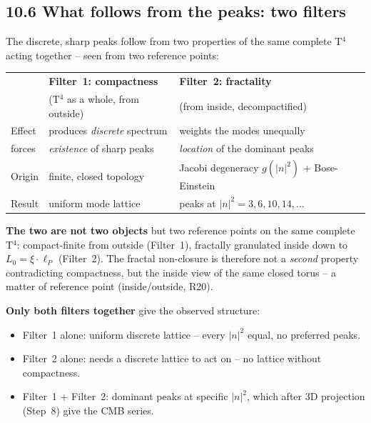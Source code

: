 \subsection*{10.6 What follows from the peaks: two filters}

The discrete, sharp peaks follow from two properties of the same
complete T$^4$ acting together -- seen from two reference points:

\begin{center}
\begin{tabular}{p{2.2cm}p{4.6cm}p{4.6cm}}
\toprule
 & \textbf{Filter~1: compactness} & \textbf{Filter~2: fractality} \\
 & (T$^4$ as a whole, from outside) & (from inside, decompactified) \\
\midrule
Effect & produces \emph{discrete} spectrum &
  weights the modes unequally \\
\addlinespace
forces & \emph{existence} of sharp peaks &
  \emph{location} of the dominant peaks \\
\addlinespace
Origin & finite, closed topology &
  Jacobi degeneracy $g(|n|^2)$ + Bose-Einstein \\
\addlinespace
Result & uniform mode lattice &
  peaks at $|n|^2 = 3, 6, 10, 14, \ldots$ \\
\bottomrule
\end{tabular}
\end{center}

\textbf{The two are not two objects} but two reference points on
the same complete T$^4$: compact-finite from outside (Filter~1),
fractally granulated inside down to $L_0 = \xi\cdot\ell_P$ (Filter~2).
The fractal non-closure is therefore not a \emph{second} property
contradicting compactness, but the inside view of the same closed
torus -- a matter of reference point (inside/outside, R20).

\textbf{Only both filters together} give the observed structure:
\begin{itemize}
  \item Filter~1 alone: uniform discrete lattice -- every
        $|n|^2$ equal, no preferred peaks.
  \item Filter~2 alone: needs a discrete lattice to act on --
        no lattice without compactness.
  \item Filter~1 $+$ Filter~2: dominant peaks at specific $|n|^2$,
        which after 3D projection (Step~8) give the CMB series.
\end{itemize}

